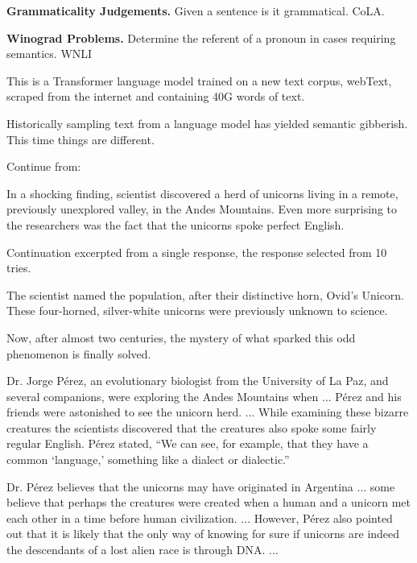 {\vfill
{\bf Grammaticality Judgements.} Given a sentence is it grammatical. {\color{red} CoLA}.

\vfill
{\bf Winograd Problems.} Determine the referent of a pronoun in cases requiring semantics. {\color{red} WNLI}


This is a Transformer language model trained on a new text corpus, webText, scraped from the internet and containing 40G words of text.

\vfill
Historically sampling text from a language model has yielded semantic gibberish.  This time things are different.

\vfill
{}

{\color{red} Continue from:}

\vfill
In a shocking finding, scientist discovered a herd of unicorns living in a remote, previously unexplored valley, in the Andes Mountains. Even more surprising to the researchers was the fact that the unicorns spoke perfect English.


{\color{red} Continuation excerpted from a single response, the response selected from 10 tries.}

\bigskip

The scientist named the population, after their distinctive horn, Ovid’s Unicorn. These four-horned, silver-white unicorns were previously unknown to science.

Now, after almost two centuries, the mystery of what sparked this odd phenomenon is finally solved.

Dr. Jorge Pérez, an evolutionary biologist from the University of La Paz, and several companions, were exploring the Andes Mountains when ...
Pérez and his friends were astonished to see the unicorn herd. ...
While examining these bizarre creatures the scientists discovered that the creatures also spoke some fairly regular English. Pérez stated, “We can see, for example, that they have a common ‘language,’ something like a dialect or dialectic.”

Dr. Pérez believes that the unicorns may have originated in Argentina ... some believe that perhaps the creatures were created when a human and a unicorn met each other in a time before human civilization. ... However, Pérez also pointed out that it is likely that the only way of knowing for sure if unicorns are indeed the descendants of a lost alien race is through DNA. ...

}
